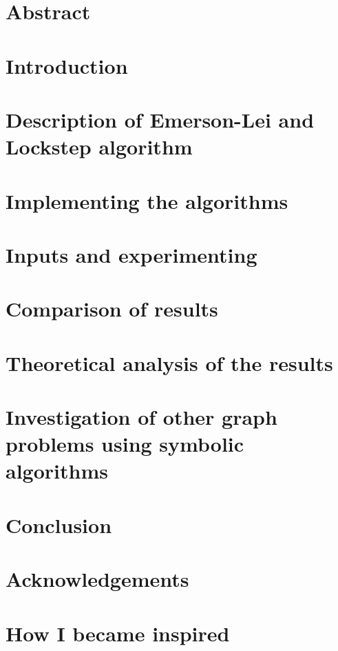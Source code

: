 \documentclass[a4, english]{article}
\title{\titlecontent}
\author{Magdalena Kalin-Czerska}
\author{Jonathan Eilath}
\author{Mikael Bisgaard Dahlsen-Jensen}
\affil{Aarhus University}
\newcommand{\sectionpath}{../sections/}
\begin{document}
 \pagestyle{empty}

\maketitle

\newpage

\section{Abstract}

\section{Introduction}

\section{Description of Emerson-Lei and Lockstep algorithm}

\section{Implementing the algorithms}

\section{Inputs and experimenting}

\section{Comparison of results}

\section{Theoretical analysis of the results}

\section{Investigation of other graph problems using symbolic algorithms}

\section{Conclusion}

\section{Acknowledgements}

\printbibliography
\appendix
\section{How I became inspired}
\end{document}
